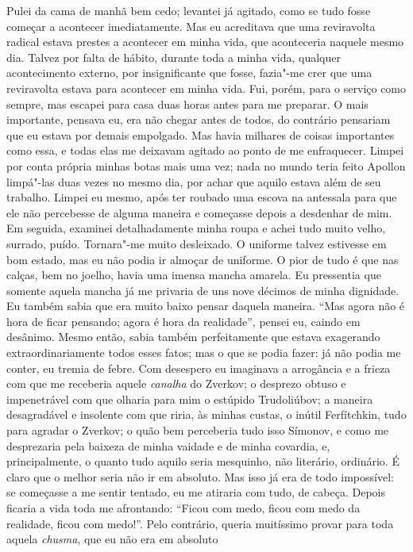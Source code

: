 Pulei da cama de manhã bem cedo; levantei já agitado, como se tudo fosse
começar a acontecer imediatamente. Mas eu acreditava que uma
reviravolta radical estava prestes a acontecer em minha vida, que
aconteceria naquele mesmo dia. Talvez por falta de hábito, durante toda
a minha vida, qualquer acontecimento externo, por insignificante que
fosse, fazia"-me crer que uma reviravolta estava para acontecer em minha
vida. Fui, porém, para o serviço como sempre, mas escapei para casa
duas horas antes para me preparar. O mais importante, pensava eu, era
não chegar antes de todos, do contrário pensariam que eu estava por
demais empolgado. Mas havia milhares de coisas importantes como essa, e
todas elas me deixavam agitado ao ponto de me enfraquecer. Limpei por
conta própria minhas botas mais uma vez; nada no mundo teria feito
Apollon limpá"-las duas vezes no mesmo dia, por achar que aquilo estava
além de seu trabalho. Limpei eu mesmo, após ter roubado uma escova na
antessala para que ele não percebesse de alguma maneira e começasse
depois a desdenhar de mim. Em seguida, examinei detalhadamente minha
roupa e achei tudo muito velho, surrado, puído. Tornara"-me muito
desleixado. O uniforme talvez estivesse em bom estado, mas eu não podia
ir almoçar de uniforme. O pior de tudo é que nas calças, bem no joelho,
havia uma imensa mancha amarela. Eu pressentia que somente aquela
mancha já me privaria de uns nove décimos de minha dignidade. Eu também
sabia que era muito baixo pensar daquela maneira. ``Mas agora não é hora
de ficar pensando; agora é hora da realidade'', pensei eu, caindo em
desânimo. Mesmo então, sabia também perfeitamente que estava exagerando
extraordinariamente todos esses fatos; mas o que se podia fazer: já não
podia me conter, eu tremia de febre. Com desespero eu imaginava a
arrogância e a frieza com que me receberia aquele \textit{canalha} do Zverkov;
o desprezo obtuso e impenetrável com que olharia para mim o estúpido
Trudoliúbov; a maneira desagradável e insolente com que riria, às
minhas custas, o inútil Ferfítchkin, tudo para agradar o Zverkov; o
quão bem perceberia tudo isso Símonov, e como me desprezaria pela
baixeza de minha vaidade e de minha covardia, e, principalmente, o
quanto tudo aquilo seria mesquinho, não literário, ordinário. É claro
que o melhor seria não ir em absoluto. Mas isso já era de todo
impossível: se começasse a me sentir tentado, eu me atiraria com tudo,
de cabeça. Depois ficaria a vida toda me afrontando: ``Ficou com medo,
ficou com medo da realidade, ficou com medo!''. Pelo contrário, queria
muitíssimo provar para toda aquela \textit{chusma}, que eu não era em absoluto
